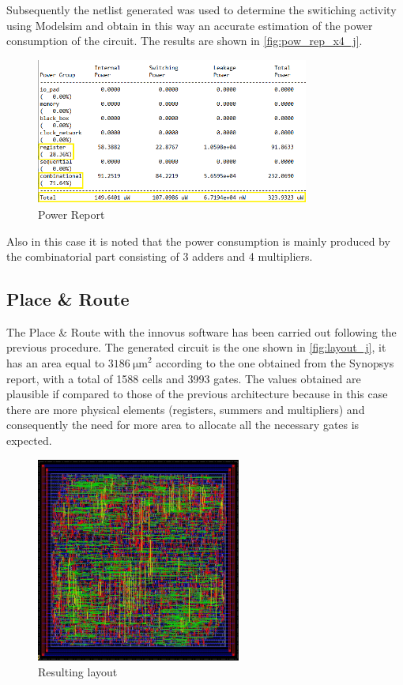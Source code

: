 Subsequently the netlist generated was used to determine the switiching activity using Modelsim and obtain in this way an accurate estimation of the power consumption of the circuit. The results are shown in \autoref{fig:pow_rep_x4_j}.

\begin{figure}[h]
	\center
	\includegraphics[width=0.8\textwidth]{images/report_power_x4_j_mod.png}
	\caption{Power Report}
	\label{fig:pow_rep_x4_j}
\end{figure}

Also in this case it is noted that the power consumption is mainly produced by the combinatorial part consisting of 3 adders and 4 multipliers.

\subsection{Place \& Route}
The Place \& Route with the innovus software has been carried out following the previous procedure. The generated circuit is the one shown in \autoref{fig:layout_j}, it has an area equal to $\SI{3186}{\micro\meter}^2$ according to the one obtained from the Synopsys report, with a total of 1588 cells and 3993 gates. The values obtained are plausible if compared to those of the previous architecture because in this case there are more physical elements (registers, summers and multipliers) and consequently the need for more area to allocate all the necessary gates is expected.

\begin{figure}[h]
	\center
	\includegraphics[width=0.6\textwidth]{images/IIR_filter_period_min_x4_place_j.jpg}
	\caption{Resulting layout}
	\label{fig:layout_j}
\end{figure}

